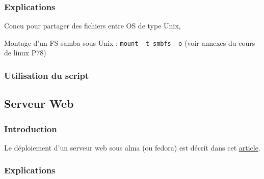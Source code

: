 \documentclass{article}
\begin{document}
	\subsubsection{Explications}
	Concu pour partager des fichiers entre OS de type Unix, 
	
	Montage d'un FS samba sous Unix :
	\texttt{mount -t smbfs -o} (voir annexes du cours de linux P78)
	\subsubsection{Utilisation du script}
	
	\newpage
	
	
	
	
	
	
	
	
	
	
	\subsection{Serveur Web}
	\subsubsection{Introduction}
	Le déploiement d'un serveur web sous alma (ou fedora) est décrit dans cet \href{https://docs.fedoraproject.org/en-US/fedora-server/services/httpd-basic-setup/}{article}.
	
	\subsubsection{Explications}	
		
\end{document}
